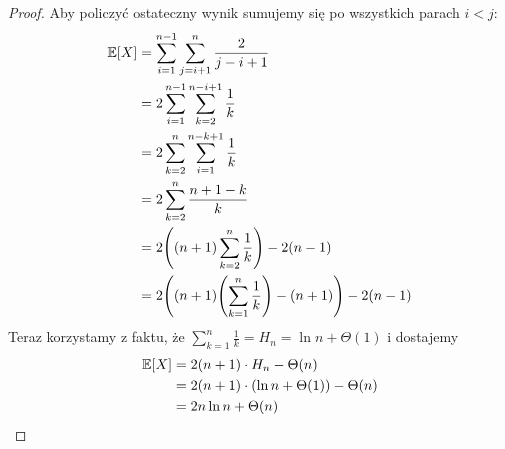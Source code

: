 \begin{proof}
Aby policzyć ostateczny wynik sumujemy się po wszystkich parach \( i < j \):
\begin{align*}
    \expected{X} 
        &= \sum_{i=1}^{n-1} \sum_{j=i+1}^{n} \frac{2}{j - i + 1} \\
        &= 2\sum_{i=1}^{n-1} \sum_{k=2}^{n-i+1} \frac{1}{k} \\
        &= 2\sum_{k=2}^n \sum_{i=1}^{n-k+1} \frac{1}{k} \\
        &= 2\sum_{k=2}^n \frac{n+1-k}{k} \\
        &= 2\pars{(n+1)\sum_{k=2}^n \frac{1}{k}} - 2(n-1) \\
        &= 2\pars{(n+1)\pars{\sum_{k=1}^n \frac{1}{k}} - (n+1)} - 2(n-1)
\end{align*}
Teraz korzystamy z faktu, że \( \sum_{k=1}^n \frac{1}{k} = H_n = \ln n + \Theta(1) \) i dostajemy
\begin{align*}
    \expected{X}
        &= 2(n+1)\cdot H_n - \Theta(n) \\
        &= 2(n+1)\cdot\pars{\ln n + \Theta(1)} - \Theta(n) \\
        &= 2n \ln n + \Theta(n)
\end{align*}
\end{proof}
